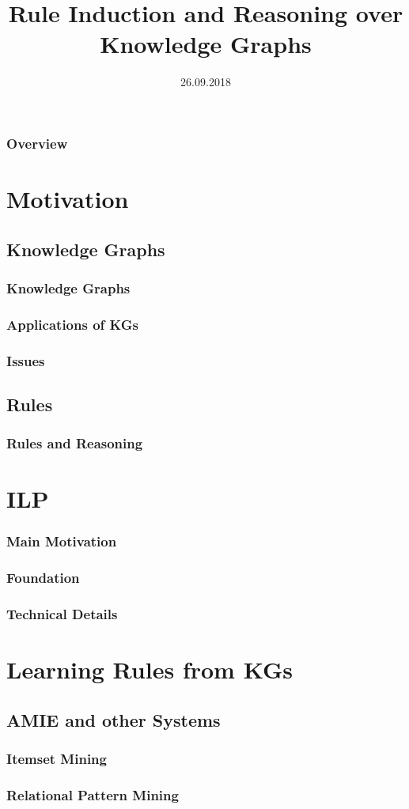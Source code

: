 \documentclass{beamer}
\title{Rule Induction and Reasoning over Knowledge Graphs}
\author[Stepanova, Gad-Elrab, Vinh Ho]
 {
 }
\date{26.09.2018}
\newcommand{\makeoverview}{%
  \begin{frame}
    \frametitle{Overview}
    \tableofcontents
  \end{frame}
}
\begin{document}
\frame{\titlepage}


\addtocounter{framenumber}{-1}

\makeoverview



\section{Motivation}

\subsection{Knowledge Graphs}
\begin{frame}\frametitle{Knowledge Graphs}
\end{frame}
\begin{frame}\frametitle{Applications of KGs}
\end{frame}
\begin{frame}\frametitle{Issues}
\end{frame}
\subsection{Rules}
\begin{frame}\frametitle{Rules and Reasoning}
\end{frame}
\section{ILP}
\begin{frame}\frametitle{Main Motivation}
\end{frame}
\begin{frame}\frametitle{Foundation}
\end{frame}
\begin{frame}\frametitle{Technical Details}
\end{frame}

\section{Learning Rules from KGs}
\subsection{AMIE and other Systems}
\begin{frame}
\frametitle{Itemset Mining}
\end{frame}
\begin{frame}
\frametitle{Relational Pattern Mining}
\end{frame}
\end{document}
